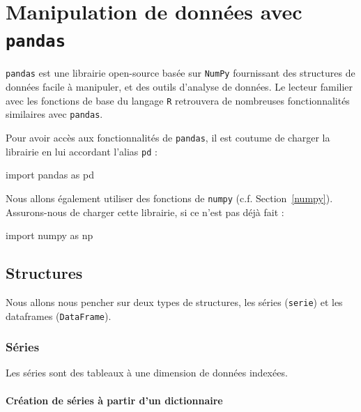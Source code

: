 \documentclass[12pt,]{book}
\newenvironment{Shaded}{\begin{snugshade}}{\end{snugshade}}
\newcommand{\ImportTok}[1]{#1}
\newcommand{\NormalTok}[1]{#1}
\numberwithin{equation}{section}
\numberwithin{countremarque}{section}
\begin{document}
\chapter{\texorpdfstring{Manipulation de données avec
\texttt{pandas}}{Manipulation de données avec pandas}}\label{pandas}

\texttt{pandas} est une librairie open-source basée sur \texttt{NumPy}
fournissant des structures de données facile à manipuler, et des outils
d'analyse de données. Le lecteur familier avec les fonctions de base du
langage \texttt{R} retrouvera de nombreuses fonctionnalités similaires
avec \texttt{pandas}.

Pour avoir accès aux fonctionnalités de \texttt{pandas}, il est coutume
de charger la librairie en lui accordant l'alias \texttt{pd} :

\begin{Shaded}
\begin{Highlighting}[]
\ImportTok{import}\NormalTok{ pandas }\ImportTok{as}\NormalTok{ pd}
\end{Highlighting}
\end{Shaded}

Nous allons également utiliser des fonctions de \texttt{numpy} (c.f.
Section~\ref{numpy}). Assurons-nous de charger cette librairie, si ce
n'est pas déjà fait :

\begin{Shaded}
\begin{Highlighting}[]
\ImportTok{import}\NormalTok{ numpy }\ImportTok{as}\NormalTok{ np}
\end{Highlighting}
\end{Shaded}

\section{Structures}\label{structures-1}

Nous allons nous pencher sur deux types de structures, les séries
(\texttt{serie}) et les dataframes (\texttt{DataFrame}).

\subsection{Séries}\label{series}

Les séries sont des tableaux à une dimension de données indexées.

\subsubsection{Création de séries à partir d'un
dictionnaire}\label{creation-de-series-a-partir-dun-dictionnaire}
\end{document}
